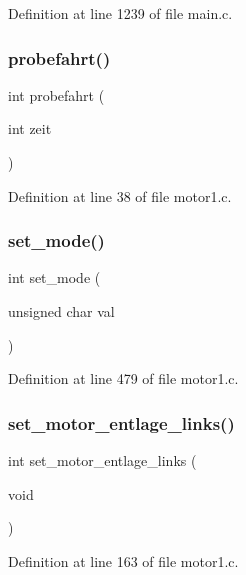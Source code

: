 Definition at line 1239 of file main.\+c.

\mbox{\label{motor1_8c_aa3482fd571b315d112e8514a1b765b75}} 
\subsubsection{probefahrt()}
{\footnotesize\ttfamily int probefahrt (\begin{DoxyParamCaption}\item[{int}]{zeit }\end{DoxyParamCaption})}



Definition at line 38 of file motor1.\+c.

\mbox{\label{motor1_8c_a159542ecde643af0cd48a7576fd974c1}} 
\subsubsection{set\+\_\+mode()}
{\footnotesize\ttfamily int set\+\_\+mode (\begin{DoxyParamCaption}\item[{unsigned char}]{val }\end{DoxyParamCaption})}



Definition at line 479 of file motor1.\+c.

\mbox{\label{motor1_8c_a8168802a949dff7a8df33ff38eaf0d20}} 
\subsubsection{set\+\_\+motor\+\_\+entlage\+\_\+links()}
{\footnotesize\ttfamily int set\+\_\+motor\+\_\+entlage\+\_\+links (\begin{DoxyParamCaption}\item[{void}]{ }\end{DoxyParamCaption})}



Definition at line 163 of file motor1.\+c.

\mbox{\label{motor1_8c_ae7371f4fed363ba54f2f894ac3720c06}} 
